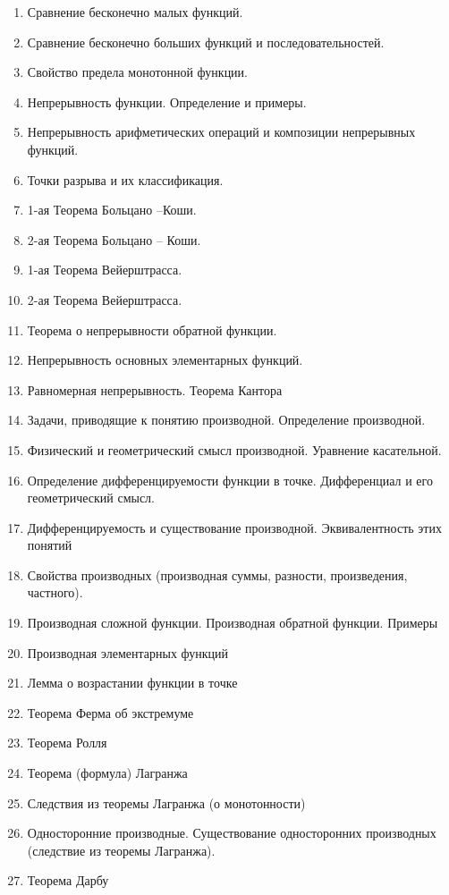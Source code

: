 \documentclass{article}
\begin{document}
\begin{enumerate}
    \item Сравнение бесконечно малых функций. 
    \item Сравнение бесконечно больших функций и последовательностей. 
    \item Свойство предела монотонной функции. 
    \item Непрерывность функции. Определение и примеры. 
    \item Непрерывность арифметических операций и композиции непрерывных функций. 
    \item Точки разрыва и их классификация. 
    \item 1-ая Теорема Больцано –Коши. 
    \item 2-ая Теорема Больцано – Коши. 
    \item 1-ая Теорема Вейерштрасса. 
    \item 2-ая Теорема Вейерштрасса. 
    \item Теорема о непрерывности обратной функции. 
    \item Непрерывность основных элементарных функций. 
    \item Равномерная непрерывность. Теорема Кантора
    \item Задачи, приводящие к понятию производной. Определение производной. 
    \item Физический и геометрический смысл производной. Уравнение касательной. 
    \item Определение дифференцируемости функции в точке. Дифференциал и его геометрический смысл. 
    \item Дифференцируемость и существование производной. Эквивалентность этих понятий 
    \item Свойства производных (производная суммы, разности, произведения, частного). 
    \item Производная сложной функции. Производная обратной функции. Примеры
    \item Производная элементарных функций
    \item Лемма о возрастании функции в точке
    \item Теорема Ферма об экстремуме
    \item Теорема Ролля 
    \item Теорема (формула) Лагранжа 
    \item Следствия из теоремы Лагранжа (о монотонности) 
    \item Односторонние производные. Существование односторонних производных (следствие из теоремы Лагранжа).
    \item Теорема Дарбу 

\end{enumerate}
\end{document}
